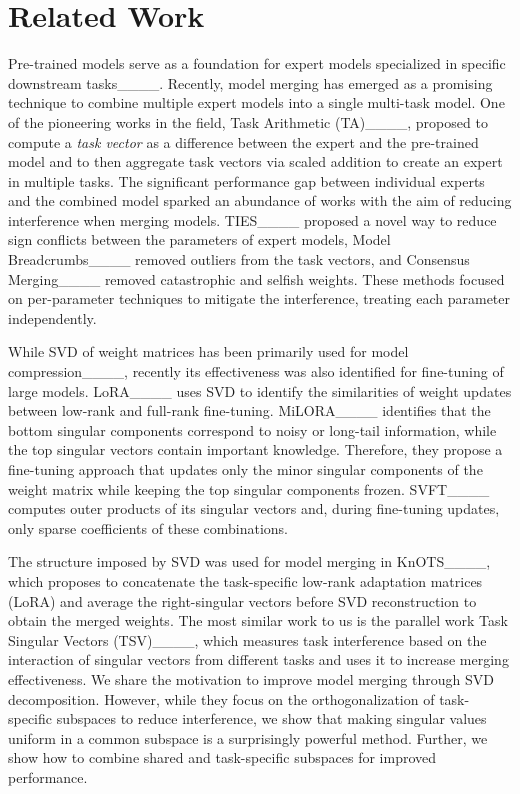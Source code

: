 \section{Related Work}
Pre-trained models serve as a foundation for expert models specialized in specific downstream tasks____. Recently, model merging has emerged as a promising technique to combine multiple expert models into a single multi-task model.
One of the pioneering works in the field, Task Arithmetic (TA)____, proposed to compute a \textit{task vector} as a difference between the expert and the pre-trained model and to then aggregate task vectors via scaled addition to create an expert in multiple tasks. The significant performance gap between individual experts and the combined model sparked an abundance of works with the aim of reducing interference when merging models. TIES____ proposed a novel way to reduce sign conflicts between the parameters of expert models, Model Breadcrumbs____ removed outliers from the task vectors, and Consensus Merging____ removed catastrophic and selfish weights. These methods focused on per-parameter techniques to mitigate the interference, treating each parameter independently.

While SVD of weight matrices has been primarily used for model compression____, recently its effectiveness was also identified for fine-tuning of large models. LoRA____ uses SVD to identify the similarities of weight updates between low-rank and full-rank fine-tuning.
MiLORA____ identifies that the bottom singular components correspond to noisy or long-tail information, while the top singular vectors contain important knowledge. Therefore, they propose a fine-tuning approach that updates only the minor singular components of the weight matrix while keeping the top singular components frozen. 
SVFT____ computes outer products of its singular vectors and, during fine-tuning updates, only sparse coefficients of these combinations.

The structure imposed by SVD was used for model merging in KnOTS____, which proposes to concatenate the task-specific low-rank adaptation matrices (LoRA) and average the right-singular vectors before SVD reconstruction to obtain the merged weights.
The most similar work to us is the parallel work Task Singular Vectors (TSV)____, which measures task interference based on the interaction of singular vectors from different tasks and uses it to increase merging effectiveness. We share the motivation to improve model merging through SVD decomposition. However, while they focus on the orthogonalization of task-specific subspaces to reduce interference, we show that making singular values uniform in a common subspace is a surprisingly powerful method. Further, we show how to combine shared and task-specific subspaces for improved performance.

